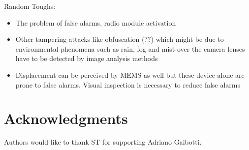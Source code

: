 \documentclass{llncs}
\begin{document}
Random Toughs:
\begin{itemize}
\item The problem of false alarms, radio module activation
\item Other tampering attacks like obfuscation (??) which might be due to environmental phenomena such as rain, fog and mist over the camera lenses have to be detected by image analysis methods
\item Displacement can be perceived by MEMS as well but these device alone are prone to false alarms. Visual inspection is necessary to reduce false alarms

\end{itemize}


\section*{Acknowledgments}\label{sec:Acknowledgments}
Authors would like to thank ST for supporting Adriano Gaibotti.




%	
%	
\end{document}
